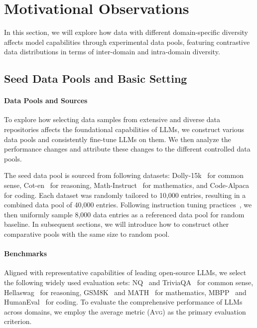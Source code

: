 \section{Motivational Observations}
\label{sec:observation}
In this section, we will explore how data with different domain-specific diversity affects model capabilities through experimental data pools, featuring contrastive data distributions in terms of inter-domain and intra-domain diversity.

\subsection{Seed Data Pools and Basic Setting}
\label{sec:sec3-data-pool}

\paragraph{Data Pools and Sources} 
To explore how selecting data samples from extensive and diverse data repositories affects the foundational capabilities of LLMs, we construct various data pools and consistently fine-tune LLMs on them. We then analyze the performance changes and attribute these changes to the different controlled data pools.


The seed data pool is sourced from following datasets: Dolly-15k~\cite{dolly-15k} for common sense, Cot-en~\cite{cot-en} for reasoning, Math-Instruct~\cite{math-instruct} for mathematics, and Code-Alpaca~\cite{code-alpaca} for coding. Each dataset was randomly tailored to 10,000 entries, resulting in a combined data pool of 40,000 entries. Following instruction tuning practices~\cite{zhou2024lima, liu2023deita}, we then uniformly sample 8,000 data entries as a referenced data pool for random baseline. In subsequent sections, we will introduce how to construct other comparative pools with the same size to random pool.

\paragraph{Benchmarks}
Aligned with representative capabilities of leading open-source LLMs, we select the following widely used evaluation sets: NQ~\cite{nq} and TriviaQA~\cite{triviaqa} for common sense, Hellaswag~\cite{hellaswag} for reasoning, GSM8K~\cite{gsm8k} and MATH~\cite{math} for mathematics, MBPP~\cite{mbpp} and HumanEval~\cite{humaneval} for coding. To evaluate the comprehensive performance of LLMs across domains, we employ the average metric (\textsc{Avg}) as the primary evaluation criterion.

